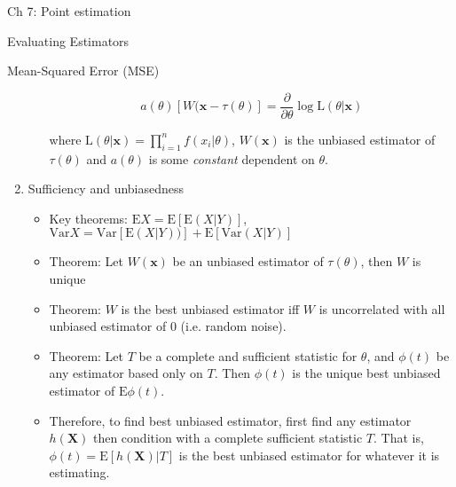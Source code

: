 \documentclass{article}
\newcommand{\E}{\mathrm{E}}
\newcommand{\Like}{\mathrm{L}}
\newcommand{\Var}{\mathrm{Var}}
\newcommand{\bo}[1]{\boldsymbol{#1}}
\newcommand{\pderiv}[1]{\frac{\partial}{\partial#1}}
\begin{document}
\begin{section}{Ch 7: Point estimation}
\begin{subsection}{Evaluating Estimators}
\begin{subsubsection}{Mean-Squared Error (MSE)}
\begin{enumerate}
\begin{itemize}
  \[ a(\theta) [W(\bo{x} - \tau(\theta)] = \pderiv{\theta} \log 
      \Like(\theta | \bo{x}) \]
  
  \noindent where $\Like(\theta | \bo{x}) = \prod_{i=1}^{n} f(x_{i}|\theta)$,
  $W(\bo{x})$ is the unbiased estimator of $\tau(\theta)$ and $a(\theta)$
  is some \emph{constant} dependent on $\theta$.
  \end{itemize}

\item Sufficiency and unbiasedness
  \begin{itemize}
  \item Key theorems: $\E X = \E[\E(X|Y)]$, $\Var X = \Var[\E(X|Y))] + 
  \E[\Var(X|Y)]$

  \item Theorem: Let $W(\bo{x})$ be an unbiased estimator of $\tau(\theta)$, 
    then $W$ is unique

  \item Theorem: $W$ is the best unbiased estimator iff $W$ is uncorrelated
    with all unbiased estimator of 0 (i.e. random noise).

  \item Theorem: Let $T$ be a complete and sufficient statistic for $\theta$,
    and $\phi(t)$ be any estimator based only on $T$. Then $\phi(t)$ is the
    unique best unbiased estimator of $\E \phi(t)$.

  \item Therefore, to find best unbiased estimator, first find any estimator
    $h(\bo{X})$ then condition with a complete sufficient statistic $T$. 
    That is, $\phi(t) = \E[h(\bo{X})|T]$  is the best unbiased estimator for
    whatever it is estimating.
  \end{itemize}
\end{enumerate}
\end{subsubsection}
\end{subsection}
\end{section}
\end{document}
